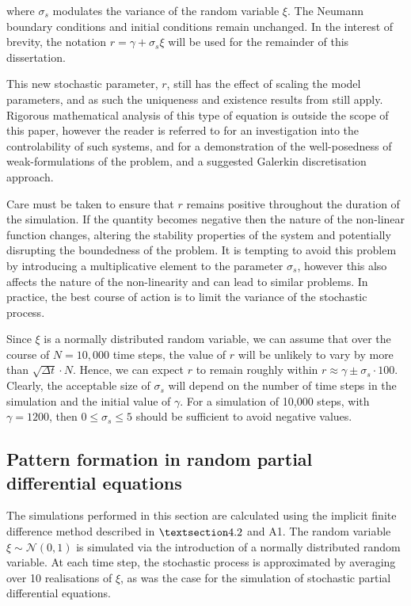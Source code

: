 \documentclass[12pt]{article}
\begin{document}
where $\sigma_s$ modulates the variance of the random variable $\xi$. The Neumann boundary conditions and initial conditions remain unchanged. In the interest of brevity, the notation $r=\gamma +\sigma_s\xi$ will be used for the remainder of this dissertation. 

This new stochastic parameter, $r$, still has the effect of scaling the model parameters, and as such the uniqueness and existence results from  still apply. Rigorous mathematical analysis of this type of equation is outside the scope of this paper, however the reader is referred to \cite{Lu} for an investigation into the controlability of such systems, and \cite{Gittelson} for a demonstration of the well-posedness of weak-formulations of the problem, and a suggested Galerkin discretisation approach.

Care must be taken to ensure that $r$ remains positive throughout the duration of the simulation. If the quantity becomes negative then the nature of the non-linear function changes, altering the stability properties of the system and potentially disrupting the boundedness of the problem. It is tempting to avoid this problem by introducing a multiplicative element to the parameter $\sigma_s$, however this also affects the nature of the non-linearity and can lead to similar problems. In practice, the best course of action is to limit the variance of the stochastic process. 

Since $\xi$ is a normally distributed random variable, we can assume that over the course of $N=10,000$ time steps, the value of $r$ will be unlikely to vary by more than $\sqrt{\Delta t}\cdot N$. Hence, we can expect $r$ to remain roughly within $r \approx \gamma \pm \sigma_s \cdot 100$. Clearly, the acceptable size of $\sigma_s$ will depend on the number of time steps in the simulation and the initial value of $\gamma$. For a simulation of 10,000 steps, with $\gamma = 1200$, then $0 \leq \sigma_s \leq 5$ should be sufficient to avoid negative values.

\subsection{Pattern formation in random partial differential equations}

The simulations performed in this section are calculated using the implicit finite difference method described in $\textsection 4.2$ and A1. The random variable $\xi \sim \mathcal{N}(0,1)$ is simulated via the introduction of a normally distributed random variable. At each time step, the stochastic process is approximated by averaging over 10 realisations of $\xi$, as was the case for the simulation of stochastic partial differential equations. 
\end{document}
